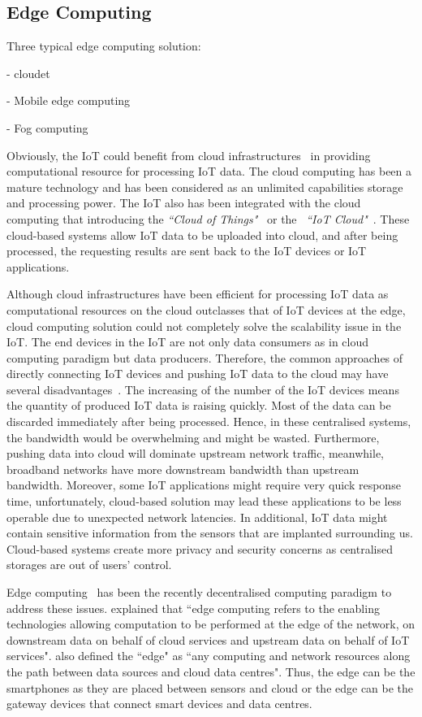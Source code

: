 \subsection{Edge Computing}

Three typical edge computing solution:

- cloudet 

- Mobile edge computing

- Fog computing

Obviously, the IoT could benefit from cloud infrastructures~\citep{Botta:2016} in providing computational resource for processing IoT data.
The cloud computing has been a mature technology and has been considered as an unlimited capabilities storage and processing power.
The IoT also has been integrated with the cloud computing that introducing the \textit{``Cloud of Things"}~\citep{Jiehan:2013} or the ~\textit{``IoT Cloud"}~\citep{Truong:2015}.
These cloud-based systems allow IoT data to be uploaded into cloud, and after being processed, the requesting results are sent back to the IoT devices or IoT applications.

Although cloud infrastructures have been efficient for processing IoT data as computational resources on the cloud outclasses that of IoT devices at the edge, cloud computing solution could not completely solve the scalability issue in the IoT.
The end devices in the IoT are not only data consumers as in cloud computing paradigm but data producers.
Therefore, the common approaches of directly connecting IoT devices and pushing IoT data to the cloud may have several disadvantages~\citep{Zhang:2015}.
The increasing of the number of the IoT devices means the quantity of produced IoT data is raising quickly.
Most of the data can be discarded immediately after being processed.
Hence, in these centralised systems, the bandwidth would be overwhelming and might be wasted.
Furthermore, pushing data into cloud will dominate upstream network traffic, meanwhile, broadband networks have more downstream bandwidth than upstream bandwidth.
Moreover, some IoT applications might require very quick response time, unfortunately, cloud-based solution may lead these applications to be less operable due to unexpected network latencies.
In additional, IoT data might contain sensitive information from the sensors that are implanted surrounding us.
Cloud-based systems create more privacy and security concerns as centralised storages are out of users' control.

Edge computing~\citep{Salman:2015} has been the recently decentralised computing paradigm to address these issues.
\cite{WShi:2016} explained that ``edge computing refers to the enabling technologies allowing computation to be performed at the edge of the network,
on downstream data on behalf of cloud services and upstream data on behalf of IoT services".
\cite{WShi:2016} also defined the ``edge" as ``any computing and network resources along the path between data sources and cloud data centres".
Thus, the edge can be the smartphones as they are placed between sensors and cloud or the edge can be the gateway devices that connect smart devices and data centres.

